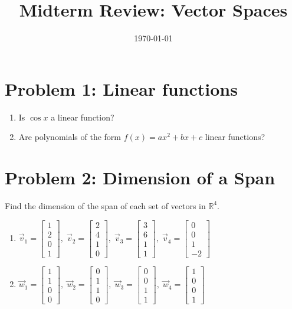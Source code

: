 \documentclass[11pt]{article}
\title{Midterm Review: Vector Spaces}
\date{\today}
\begin{document}
\thispagestyle{fancy}

\section*{Problem 1: Linear functions}
\begin{enumerate}
    \item[(a)] Is $\cos x$ a linear function?
    \item[(b)] Are polynomials of the form $f(x)=ax^2+bx+c$ linear functions?
\end{enumerate}

\section*{Problem 2: Dimension of a Span}
Find the dimension of the span of each set of vectors in $\mathbb{R}^4$.
\begin{enumerate}
    \item[(a)] $\vec{v}_1=\begin{bmatrix}1\\2\\0\\1\end{bmatrix},\;
    \vec{v}_2=\begin{bmatrix}2\\4\\1\\0\end{bmatrix},\;
    \vec{v}_3=\begin{bmatrix}3\\6\\1\\1\end{bmatrix},\;
    \vec{v}_4=\begin{bmatrix}0\\0\\1\\-2\end{bmatrix}$
    \vspace{0.5em}
    \item[(b)] $\vec{w}_1=\begin{bmatrix}1\\1\\0\\0\end{bmatrix},\;
    \vec{w}_2=\begin{bmatrix}0\\1\\1\\0\end{bmatrix},\;
    \vec{w}_3=\begin{bmatrix}0\\0\\1\\1\end{bmatrix},\;
    \vec{w}_4=\begin{bmatrix}1\\0\\0\\1\end{bmatrix}$
\end{enumerate}
\end{document}
